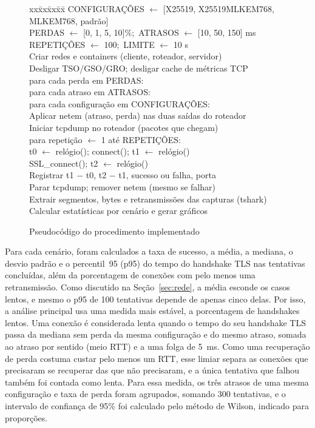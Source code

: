\documentclass[12pt,a4paper]{article}
\newcommand{\fonte}[1]{\par\vspace{4pt}{\small Fonte: #1}}
\begin{document}
\begin{figure}[H]
\centering
\caption{Pseudocódigo do procedimento implementado}
\label{alg:coleta}
\begin{minipage}{0.97\linewidth}
\small
\ttfamily
\begin{tabbing}
xx\=xx\=xx\=xx\=\kill
CONFIGURAÇÕES $\leftarrow$ [X25519, X25519MLKEM768, MLKEM768, padrão]\\
PERDAS $\leftarrow$ [0, 1, 5, 10]\%;\ ATRASOS $\leftarrow$ [10, 50, 150] ms\\
REPETIÇÕES $\leftarrow$ 100;\ LIMITE $\leftarrow$ 10 s\\[3pt]
Criar redes e containers (cliente, roteador, servidor)\\
Desligar TSO/GSO/GRO; desligar cache de métricas TCP\\
para cada perda em PERDAS:\\
\> para cada atraso em ATRASOS:\\
\>\> para cada configuração em CONFIGURAÇÕES:\\
\>\>\> Aplicar netem (atraso, perda) nas duas saídas do roteador\\
\>\>\> Iniciar tcpdump no roteador (pacotes que chegam)\\
\>\>\> para repetição $\leftarrow$ 1 até REPETIÇÕES:\\
\>\>\>\> t0 $\leftarrow$ relógio(); connect(); t1 $\leftarrow$ relógio()\\
\>\>\>\> SSL\_connect(); t2 $\leftarrow$ relógio()\\
\>\>\>\> Registrar t1 $-$ t0, t2 $-$ t1, sucesso ou falha, porta\\
\>\>\> Parar tcpdump; remover netem (mesmo se falhar)\\[3pt]
Extrair segmentos, bytes e retransmissões das capturas (tshark)\\
Calcular estatísticas por cenário e gerar gráficos
\end{tabbing}
\end{minipage}
\fonte{Elaborado pelos autores.}
\end{figure}

Para cada cenário, foram calculados a taxa de sucesso, a média, a mediana,
o desvio padrão e o percentil~95 (p95) do tempo do handshake TLS nas
tentativas concluídas, além da porcentagem de conexões com pelo menos uma
retransmissão. Como discutido na Seção~\ref{sec:rede}, a média esconde os
casos lentos, e mesmo o p95 de 100 tentativas depende de apenas cinco
delas. Por isso, a análise principal usa uma medida mais estável, a
porcentagem de handshakes lentos. Uma conexão é considerada lenta quando o
tempo do seu handshake TLS passa da mediana sem perda da mesma configuração
e do mesmo atraso, somada ao atraso por sentido (meio RTT) e a uma folga de
5~ms. Como uma recuperação de perda costuma custar pelo menos um RTT, esse
limiar separa as conexões que precisaram se recuperar das que não
precisaram, e a única tentativa que falhou também foi contada como lenta.
Para essa medida, os três atrasos de uma mesma configuração e taxa de perda
foram agrupados, somando 300 tentativas, e o intervalo de confiança de 95\%
foi calculado pelo método de Wilson, indicado para proporções.
\end{document}
